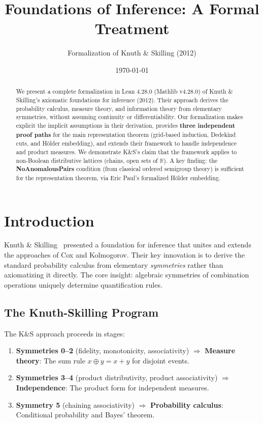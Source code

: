 \documentclass[11pt]{article}
\title{Foundations of Inference: A Formal Treatment}
\author{Formalization of Knuth \& Skilling (2012)}
\date{\today}
\theoremstyle{definition}
\theoremstyle{remark}
\begin{document}
\maketitle

\begin{abstract}
We present a complete formalization in Lean 4.28.0 (Mathlib v4.28.0) of Knuth \& Skilling's axiomatic foundations for inference (2012).
Their approach derives the probability calculus, measure theory, and information theory from elementary symmetries, without assuming continuity or differentiability.
Our formalization makes explicit the implicit assumptions in their derivation, provides \textbf{three independent proof paths} for the main representation theorem (grid-based induction, Dedekind cuts, and H\"older embedding), and extends their framework to handle independence and product measures.
We demonstrate K\&S's claim that the framework applies to non-Boolean distributive lattices (chains, open sets of $\mathbb{R}$).
A key finding: the \textbf{NoAnomalousPairs} condition (from classical ordered semigroup theory) is sufficient for the representation theorem, via Eric Paul's formalized H\"older embedding.
\end{abstract}

\tableofcontents

\section{Introduction}

Knuth \& Skilling~\cite{KnuthSkilling2012} presented a foundation for inference that unites and extends the approaches of Cox and Kolmogorov.
Their key innovation is to derive the standard probability calculus from elementary \emph{symmetries} rather than axiomatizing it directly.
The core insight: algebraic symmetries of combination operations uniquely determine quantification rules.

\subsection{The Knuth-Skilling Program}

The K\&S approach proceeds in stages:
\begin{enumerate}
\item \textbf{Symmetries 0--2} (fidelity, monotonicity, associativity) $\Rightarrow$ \textbf{Measure theory}: The sum rule $x \oplus y = x + y$ for disjoint events.
\item \textbf{Symmetries 3--4} (product distributivity, product associativity) $\Rightarrow$ \textbf{Independence}: The product form for independent measures.
\item \textbf{Symmetry 5} (chaining associativity) $\Rightarrow$ \textbf{Probability calculus}: Conditional probability and Bayes' theorem.
\end{enumerate}
\end{document}

